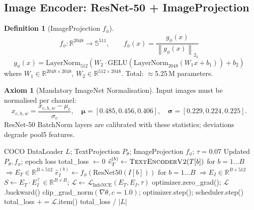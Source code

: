 \documentclass[12pt,a4paper]{article}
\theoremstyle{definition}
\newtheorem{definition}{Definition}[section]
\newtheorem{axiom}{Axiom}[section]
\theoremstyle{plain}
\theoremstyle{remark}
\newcommand{\R}{\mathbb{R}}
\newcommand{\Sph}{\mathbb{S}}
\newcommand{\Norm}[1]{\left\|#1\right\|_2}
\newcommand{\LN}{\mathrm{LayerNorm}}
\newcommand{\GELU}{\mathrm{GELU}}
\begin{document}
\subsection{Image Encoder: ResNet-50 + ImageProjection}

\begin{definition}[ImageProjection $f_\phi$]
\[
  f_\phi : \R^{2048} \to \Sph^{511}, \qquad
  f_\phi(x) = \frac{g_\phi(x)}{\Norm{g_\phi(x)}_2}
\]
\[
  g_\phi(x) = \LN_{512}\!\left(W_2 \cdot \GELU(\LN_{2048}(W_1 x + b_1)) + b_2\right)
\]
where $W_1 \in \R^{2048 \times 2048}$, $W_2 \in \R^{512 \times 2048}$. Total: $\approx$5.25\,M parameters.
\end{definition}

\begin{axiom}[Mandatory ImageNet Normalisation]
Input images must be normalised per channel:
\[
  \hat{x}_{c,h,w} = \frac{x_{c,h,w} - \mu_c}{\sigma_c}, \quad
  \bm{\mu} = [0.485, 0.456, 0.406], \quad \bm{\sigma} = [0.229, 0.224, 0.225].
\]
ResNet-50 BatchNorm layers are calibrated with these statistics; deviations degrade pool5 features.
\end{axiom}

\begin{algorithm}[H]
\caption{Pipeline A Training Epoch (Symmetric InfoNCE)}
\label{alg:trainepoch_A}
\begin{algorithmic}[1]
\Require COCO DataLoader $L$; TextProjection $P_\theta$; ImageProjection $f_\phi$; $\tau = 0.07$
\Ensure Updated $P_\theta, f_\phi$; epoch loss
\State total\_loss $\gets 0$
  \State $\hat{e}_T^{(b)} \gets \textsc{TextEncoderV2}(T[b])$ for $b=1\ldots B$ \quad $\Rightarrow E_T \in \R^{B \times 512}$
  \State $\hat{e}_I^{(b)} \gets f_\phi(\text{ResNet50}(I[b]))$ for $b=1\ldots B$ \quad $\Rightarrow E_I \in \R^{B \times 512}$
  \State $S \gets E_T \cdot E_I^\top \in \R^{B \times B}$; \quad $\mathcal{L} \gets \mathcal{L}_{\text{InfoNCE}}(E_T, E_I, \tau)$
  \State optimizer.zero\_grad(); $\mathcal{L}$.backward()
  \State clip\_grad\_norm$(\nabla\theta, c=1.0)$; optimizer.step(); scheduler.step()
  \State total\_loss $\mathrel{+}= \mathcal{L}$.item()
\EndFor
\State \Return total\_loss / $|L|$
\end{algorithmic}
\end{algorithm}

\newpage
\end{document}
